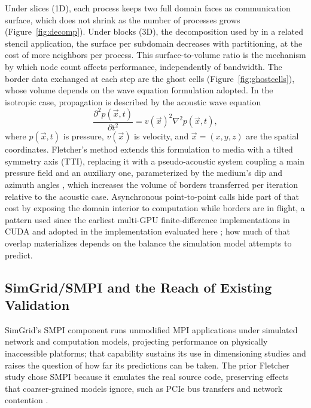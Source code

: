 \documentclass[12pt]{article}
\begin{document}
Under slices (1D), each process keeps two full domain faces as communication surface, which does not shrink as the number of processes grows (Figure~\ref{fig:decomp}). Under blocks (3D), the decomposition used by \cite{pearson2020nodeaware} in a related stencil application, the surface per subdomain decreases with partitioning, at the cost of more neighbors per process. This surface-to-volume ratio is the mechanism by which node count affects performance, independently of bandwidth. The border data exchanged at each step are the ghost cells (Figure~\ref{fig:ghostcells}), whose volume depends on the wave equation formulation adopted. In the isotropic case, propagation is described by the acoustic wave equation
\begin{equation}
\frac{\partial^2 p(\vec{x},t)}{\partial t^2} = v(\vec{x})^2 \nabla^2 p(\vec{x},t),
\label{eq:acoustic}
\end{equation}
where $p(\vec{x},t)$ is pressure, $v(\vec{x})$ is velocity, and $\vec{x}=(x,y,z)$ are the spatial coordinates. Fletcher's method extends this formulation to media with a tilted symmetry axis (TTI), replacing it with a pseudo-acoustic system coupling a main pressure field and an auxiliary one, parameterized by the medium's dip and azimuth angles \cite{fletcher2009tti}, which increases the volume of borders transferred per iteration relative to the acoustic case. Asynchronous point-to-point calls hide part of that cost by exposing the domain interior to computation while borders are in flight, a pattern used since the earliest multi-GPU finite-difference implementations in CUDA \cite{micikevicius2009fd3d} and adopted in the implementation evaluated here \cite{spadotto2026sbacpad}; how much of that overlap materializes depends on the balance the simulation model attempts to predict.
\subsection{SimGrid/SMPI and the Reach of Existing Validation}
SimGrid's SMPI component \cite{casanova2014simgrid} runs unmodified MPI applications under simulated network and computation models, projecting performance on physically inaccessible platforms; that capability sustains its use in dimensioning studies and raises the question of how far its predictions can be taken. The prior Fletcher study chose SMPI because it emulates the real source code, preserving effects that coarser-grained models ignore, such as PCIe bus transfers and network contention \cite{spadotto2026carla,hoefler2010loggopsim}.
\end{document}
